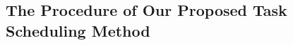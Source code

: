 \documentclass[10pt,journal]{IEEEtran}
\begin{document}




\subsection{The Procedure of Our Proposed Task Scheduling Method}



\end{document}
